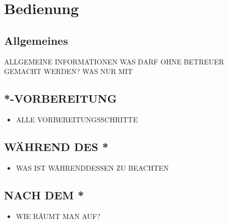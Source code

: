 \documentclass[a4paper]{article}
\begin{document}
\section{Bedienung}
\subsection{Allgemeines}
ALLGEMEINE INFORMATIONEN
WAS DARF OHNE BETREUER GEMACHT WERDEN? WAS NUR MIT
\subsection{*-VORBEREITUNG}
\begin{itemize}
	\item ALLE VORBEREITUNGSSCHRITTE
\end{itemize}
\subsection{WÄHREND DES *}
\begin{itemize}
	\item WAS IST WÄHRENDDESSEN ZU BEACHTEN
\end{itemize}
\subsection{NACH DEM *}
\begin{itemize}
	\item WIE RÄUMT MAN AUF?
\end{itemize}
\end{document}
